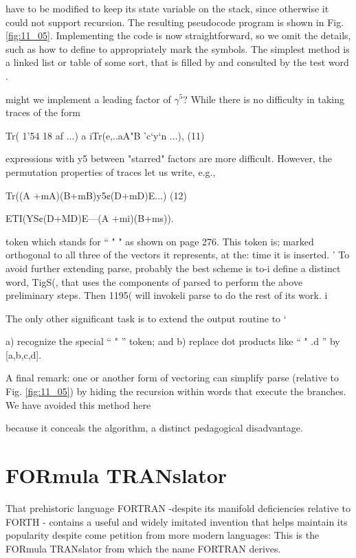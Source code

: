 have to be modified to keep its state variable on the stack, since otherwise it could not support recursion. The resulting pseudocode program is shown in Fig. \ref{fig:11_05}. Implementing the code is now straightforward, so we omit the details, such as how to define  to appropriately mark the symbols. The simplest method is a linked list or table of some sort, that is filled by  and consulted by the test word .

 might we implement a leading factor of $\gamma^{5}$? While there is no difficulty in taking traces of the form

Tr( 1'54 18 af ...) a iTr(e,..aA"B ’c‘y‘n ...), (11)

expressions with y5 between "starred" factors are more difficult.
However, the permutation properties of traces let us write, e.g.,

Tr((A +mA)(B+mB)y5¢(D+mD)E...)
(12)

ETI(YS¢(D+MD)E---(A +mi)(B+ms)).


token which stands for “ " " as shown on page 276. This token is;
marked orthogonal to all three of the vectors it represents, at the:
time it is inserted. '
To avoid further extending parse, probably the best scheme is to-i
define a distinct word, TigS(, that uses the components of parsed
to perform the above preliminary steps. Then 1195( will invokeli
parse to do the rest of its work. i

The only other significant task is to extend the output routine to ‘

a) recognize the special “ " ” token; and
b) replace dot products like “ " .d ” by [a,b,c,d].

A final remark: one or another form of vectoring can simplify
parse (relative to Fig. \ref{fig:11_05}) by hiding the recursion within words
that execute the branches. We have avoided this method here

because it conceals the algorithm, a distinct pedagogical disadvantage.

\section{FORmula TRANslator}

That prehistoric language FORTRAN -despite its manifold
deficiencies relative to FORTH - contains a useful and widely
imitated invention that helps maintain its popularity despite come
petition from more modern languages: This is the FORmula
TRANslator from which the name FORTRAN derives.

